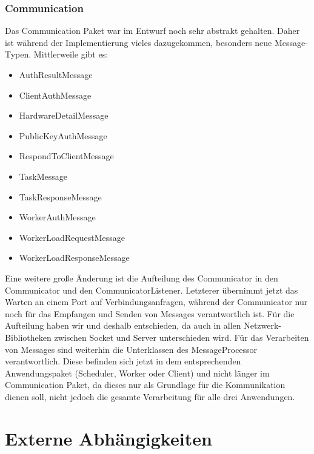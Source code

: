 \documentclass[a4paper,12pt]{article}
\begin{document}
\subsubsection{Communication}
\vspace{0.2cm}
Das Communication Paket war im Entwurf noch sehr abstrakt gehalten. Daher ist während der Implementierung vieles dazugekommen, besonders neue Message-Typen. Mittlerweile gibt es:
\begin{itemize}
	\item AuthResultMessage
	\item ClientAuthMessage
	\item HardwareDetailMessage
	\item PublicKeyAuthMessage
	\item RespondToClientMessage
	\item TaskMessage
	\item TaskResponseMessage
	\item WorkerAuthMessage
	\item WorkerLoadRequestMessage
	\item WorkerLoadResponseMessage
\end{itemize}
Eine weitere große Änderung ist die Aufteilung des Communicator in den Communicator und den CommunicatorListener. Letzterer übernimmt jetzt das Warten an einem Port auf Verbindungsanfragen, während der Communicator nur noch für das Empfangen und Senden von Messages verantwortlich ist. Für die Aufteilung haben wir und deshalb entschieden, da auch in allen Netzwerk-Bibliotheken zwischen Socket und Server unterschieden wird. Für das Verarbeiten von Messages sind weiterhin die Unterklassen des MessageProcessor verantwortlich. Diese befinden sich jetzt in dem entsprechenden Anwendungspaket (Scheduler, Worker oder Client) und nicht länger im Communication Paket, da dieses nur als Grundlage für die Kommunikation dienen soll, nicht jedoch die gesamte Verarbeitung für alle drei Anwendungen.

\clearpage
\section{Externe Abhängigkeiten}
\end{document}
